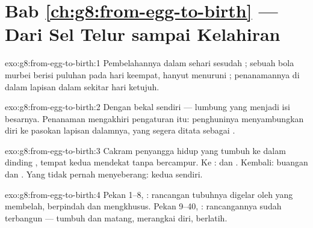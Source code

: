\section*{Bab \ref{ch:g8:from-egg-to-birth} --- Dari Sel Telur sampai Kelahiran}

\begin{solution}{exo:g8:from-egg-to-birth:1}
Pembelahannya dalam sehari sesudah ; sebuah bola
murbei berisi puluhan  pada hari keempat, hanyut menuruni
; penanamannya di dalam lapisan dalam 
sekitar hari ketujuh.
\end{solution}

\begin{solution}{exo:g8:from-egg-to-birth:2}
Dengan bekal  sendiri --- lumbung yang menjadi
isi  besarnya. Penanaman mengakhiri pengaturan itu:
penghuninya menyambungkan diri ke pasokan lapisan dalamnya,
yang segera ditata sebagai .
\end{solution}

\begin{solution}{exo:g8:from-egg-to-birth:3}
Cakram penyangga hidup yang tumbuh ke dalam dinding ,
tempat kedua  mendekat tanpa bercampur. Ke :
 dan . Kembali: buangan dan .
Yang tidak pernah menyeberang: kedua  sendiri.
\end{solution}

\begin{solution}{exo:g8:from-egg-to-birth:4}
Pekan 1--8, : rancangan tubuhnya digelar oleh 
yang membelah, berpindah dan mengkhusus. Pekan 9--40,
: rancangannya sudah terbangun --- tumbuh dan matang,
 merangkai diri,  berlatih.
\end{solution}

